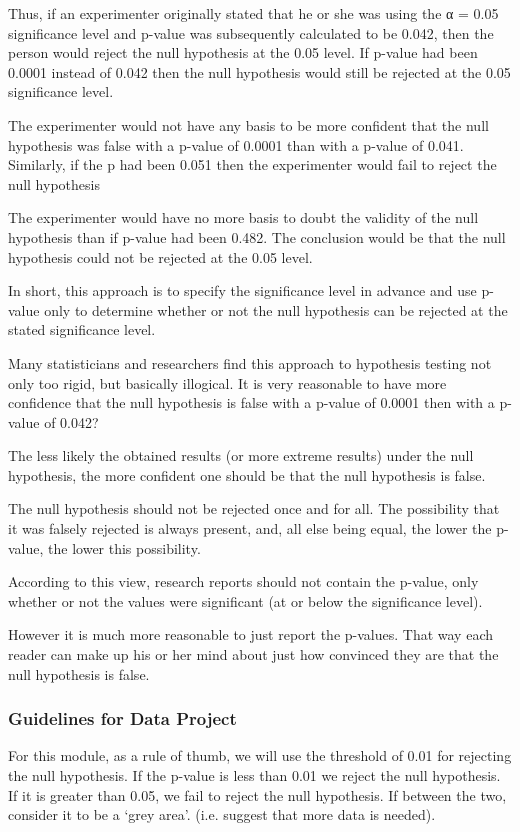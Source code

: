Thus, if an experimenter originally stated that he or she was using the α = 0.05 significance level and p-value was subsequently calculated to be 0.042, then the person would reject the null hypothesis at the 0.05 level. If p-value had been 0.0001 instead of 0.042 then the null hypothesis would still be rejected at the 0.05 significance level.

The experimenter would not have any basis to be more confident that the null hypothesis was false with a p-value of 0.0001 than with a p-value of 0.041. Similarly, if the p had been 0.051 then the experimenter would fail to reject the null hypothesis

The experimenter would have no more basis to doubt the validity of the null hypothesis than if p-value had been 0.482. The conclusion would be that the null hypothesis could not be rejected at the 0.05 level.

In short, this approach is to specify the significance level in advance and use p-value only to determine whether or not the null hypothesis can be rejected at the stated significance level.

Many statisticians and researchers find this approach to hypothesis testing not only too rigid, but basically illogical. It is very reasonable to  have more confidence that the null hypothesis is false with a p-value of 0.0001 then with a p-value of 0.042?

The less likely the obtained results (or more extreme results) under the null hypothesis, the more confident one should be that the null hypothesis is false.

The null hypothesis should not be rejected once and for all. The possibility that it was falsely rejected is always present, and, all else being equal, the lower the p-value, the lower this possibility.

According to this view, research reports should not contain the p-value, only whether or not the values were significant (at or below the significance level).

However it is much more reasonable to just report the p-values. That way each reader can make up his or her mind about just how convinced they are that the null hypothesis is false.

\subsubsection{Guidelines for Data Project}
For this module, as a rule of thumb, we will use the threshold of 0.01 for rejecting the null hypothesis. If the p-value is less than 0.01 we reject the null hypothesis. If it is greater than 0.05, we fail to reject the null hypothesis. If between the two, consider it to be a `grey area'. (i.e. suggest that more data is needed).

